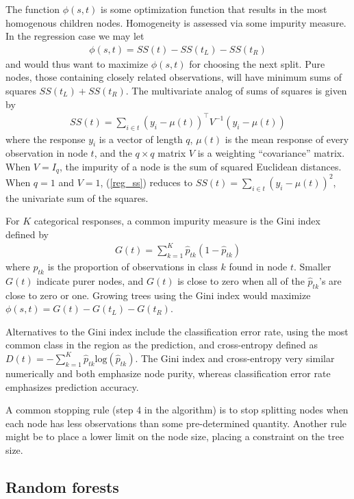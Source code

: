 The function $\phi(s, t)$ is some optimization function that results in the most homogenous children nodes. Homogeneity is assessed via some impurity measure. In the regression case we may let
\begin{eqnarray}
\phi(s, t) = SS(t) - SS(t_L) - SS(t_R)
\label{reg_phi}
\end{eqnarray}
and would thus want to maximize $\phi(s, t)$ for choosing the next split. Pure nodes, those containing closely related observations, will have minimum sums of squares $SS(t_L) + SS(t_R)$. The multivariate analog of sums of squares is given by
\begin{eqnarray}
SS(t) = \sum_{i\in t}(y_i-\mu(t))^\top V^{-1} (y_i-\mu(t))
\label{reg_ss}
\end{eqnarray}
where the response $y_i$ is a vector of length $q$, $\mu(t)$ is the mean response of every observation in node $t$, and the $q\times q$ matrix $V$ is a weighting ``covariance'' matrix. When $V=I_q$, the impurity of a node is the sum of squared Euclidean distances. When $q=1$ and $V=1$, (\ref{reg_ss}) reduces to $SS(t) = \sum_{i\in t}(y_i-\mu(t))^2$, the univariate sum of the squares.

For $K$ categorical responses, a common impurity measure is the Gini index defined by
\begin{eqnarray}
G(t) = \sum_{k=1}^K\hat{p}_{tk}(1-\hat{p}_{tk})
\label{cla_gini}
\end{eqnarray}
where $\hat{p}_{tk}$ is the proportion of observations in class $k$ found in node $t$. Smaller $G(t)$ indicate purer nodes, and $G(t)$ is close to zero when all of the $\hat{p}_{tk}$'s are close to zero or one. Growing trees using the Gini index would maximize $\phi(s, t)=G(t) - G(t_L) - G(t_R)$. 

Alternatives to the Gini index include the classification error rate, using the most common class in the region as the prediction, and cross-entropy defined as $D(t) = -\sum_{k=1}^K\hat{p}_{tk}\mathrm{log}(\hat{p}_{tk})$. The Gini index and cross-entropy very similar numerically and both emphasize node purity, whereas classification error rate emphasizes prediction accuracy.

A common stopping rule (step 4 in the algorithm) is to stop splitting nodes when each node has less observations than some pre-determined quantity. Another rule might be to place a lower limit on the node size, placing a constraint on the tree size.

\subsection{Random forests}

